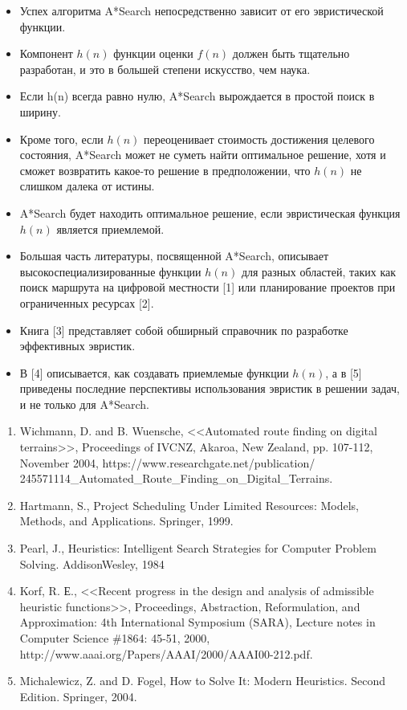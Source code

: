 \documentclass{beamer}
\begin{document}
\begin{frame}
\begin{itemize}
\item Успех алгоритма A*Search непосредственно зависит от его эвристической функции. 
\item Компонент $h(n)$ функции оценки $f(n)$ должен быть тщательно разработан, и это в большей степени искусство, чем наука. 
\item Если h(n) всегда равно нулю, A*Search вырождается в простой поиск в ширину. 
\item Кроме того, если $h(n)$ переоценивает стоимость достижения целевого состояния, A*Search может не суметь найти оптимальное решение, хотя и сможет возвратить какое-то решение в предположении, что $h(n)$
не слишком далека от истины. 
\item A*Search будет находить оптимальное решение, если эвристическая функция $h(n)$ является приемлемой.
\end{itemize}
\end{frame}

\begin{frame}
\begin{itemize}
\item Большая часть литературы, посвященной A*Search, описывает высокоспециализированные функции $h(n)$ для разных областей, таких как поиск маршрута на цифровой местности [1] или планирование проектов при ограниченных ресурсах [2]. 
\item Книга [3] представляет собой обширный справочник по разработке эффективных эвристик. 
\item В [4] описывается, как создавать приемлемые функции $h(n)$, а в [5] приведены последние перспективы использования эвристик в решении задач, и не только для A*Search.
\end{itemize}
\end{frame}

\begin{frame}
\begin{enumerate}
\item Wichmann, D. and B. Wuensche, <<Automated route finding on digital terrains>>, Proceedings of IVCNZ, Akaroa, New Zealand, pp. 107-112, November 2004, https://www.researchgate.net/publication/
245571114\_Automated\_Route\_Finding\_on\_Digital\_Terrains.
\item Hartmann, S., Project Scheduling Under Limited Resources: Models, Methods, and Applications. Springer, 1999.
\item Pearl, J., Heuristics: Intelligent Search Strategies for Computer Problem Solving. AddisonWesley, 1984
\item Korf, R. Е., <<Recent progress in the design and analysis of admissible heuristic functions>>, Proceedings, Abstraction, Reformulation, and Approximation: 4th International Symposium (SARA), Lecture notes in Computer Science \#1864: 45-51, 2000, http://www.aaai.org/Papers/AAAI/2000/AAAI00-212.pdf.
\item Michalewicz, Z. and D. Fogel, How to Solve It: Modern Heuristics. Second Edition. Springer, 2004.
\end{enumerate}
\end{frame}
\end{document}
